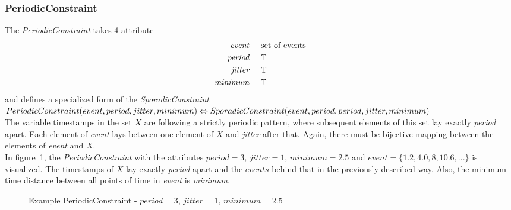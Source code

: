 	\subsubsection{PeriodicConstraint}
		The \emph{PeriodicConstraint} takes 4 attribute
		\begin{align*}
			\emph{event} 	& \hspace{.5cm}\text{set of events}\\
			\emph{period} 	& \hspace{.5cm}\mathbb{T}\\
			\emph{jitter}	& \hspace{.5cm}\mathbb{T}\\
			\emph{minimum}	& \hspace{.5cm}\mathbb{T}
		\end{align*}
		and defines a specialized form of the \emph{SporadicConstraint}\\[10pt]
		\begin{math}
			PeriodicConstraint ( event, period, jitter, minimum )\\
			\Leftrightarrow SporadicConstraint(event, period, period, jitter, minimum)
		\end{math}\\[10pt]
		The variable timestamps in the set $X$ are following a strictly periodic pattern, where subsequent elements of this set lay exactly \emph{period} apart. Each element of \emph{event} lays between one element of $X$ and \emph{jitter} after that. Again, there must be bijective mapping between the elements of \emph{event} and $X$.\\
		In figure~\ref{fig:PeriodicConstraintExample}, the \emph{PeriodicConstraint} with the attributes $period=3$, $jitter=1$, $minimum=2.5$ and $event = \{1.2, 4.0, 8, 10.6, ...\}$ is visualized. The timestamps of $X$ lay exactly \emph{period} apart and the $events$ behind that in the previously described way. Also, the minimum time distance between all points of time in \emph{event} is \emph{minimum}.
		\begin{figure}
			\caption{Example PeriodicConstraint - $period=3$, $jitter=1$, $minimum=2.5$}
			\label{fig:PeriodicConstraintExample}
		\end{figure}
		
